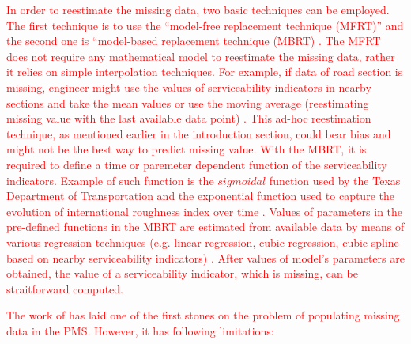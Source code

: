 \documentclass[Journal]{ascelike}
\begin{document}
\textcolor{red}{In order to reestimate the missing data, two basic techniques can be employed. The first technique is to use the ``model-free replacement technique (MFRT)'' and the second one is ``model-based replacement technique (MBRT) \cite{AlZoubi2015}. The MFRT does not require any mathematical model to reestimate the missing data, rather it relies on simple interpolation techniques. For example, if data of road section is missing, engineer might use the values of serviceability indicators in nearby sections and take the mean values or use the moving average (reestimating missing value with the last available data point) \cite{AlZoubi2015}. This ad-hoc reestimation technique, as mentioned earlier in the introduction section, could bear bias and might not be the best way to predict missing value. With the MBRT, it is required to define a time or paremeter dependent function of the serviceability indicators. Example of such function is the $sigmoidal$ function used by the Texas Department of Transportation \cite{Stampley1995} and the exponential function used to capture the evolution of international roughness index over time \cite{paterson90}. Values of parameters in the pre-defined functions in the MBRT are estimated from available data by means of various regression techniques (e.g. linear regression, cubic regression, cubic spline based on nearby serviceability indicators) \cite{AlZoubi2015}. After values of model's parameters are obtained, the value of a serviceability indicator, which is missing, can be straitforward computed. }

\textcolor{red}{The work of  has laid one of the first stones on the problem of populating missing data in the PMS. However, it has following limitations:}
\end{document}
